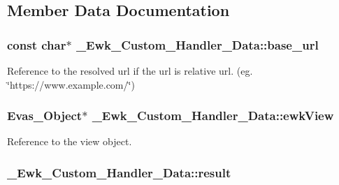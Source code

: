 \subsection{Member Data Documentation}
\hypertarget{struct__Ewk__Custom__Handler__Data_afe9e9ea292e4ee1b849591fa013a4ad0}{
\subsubsection[{base\+\_\+url}]{\setlength{\rightskip}{0pt plus 5cm}const char$\ast$ \+\_\+\+Ewk\+\_\+\+Custom\+\_\+\+Handler\+\_\+\+Data\+::base\+\_\+url}}\label{struct__Ewk__Custom__Handler__Data_afe9e9ea292e4ee1b849591fa013a4ad0}
Reference to the resolved url if the url is relative url. (eg. \char`\"{}https\+://www.\+example.\+com/\char`\"{}) \hypertarget{struct__Ewk__Custom__Handler__Data_aac0742cbb7f855d5f15880f8af398d4f}{
\subsubsection[{ewk\+View}]{\setlength{\rightskip}{0pt plus 5cm}Evas\+\_\+\+Object$\ast$ \+\_\+\+Ewk\+\_\+\+Custom\+\_\+\+Handler\+\_\+\+Data\+::ewk\+View}}\label{struct__Ewk__Custom__Handler__Data_aac0742cbb7f855d5f15880f8af398d4f}
Reference to the view object. \hypertarget{struct__Ewk__Custom__Handler__Data_aa781072df1c097837745795f0c2e74a7}{
\subsubsection[{result}]{ \+\_\+\+Ewk\+\_\+\+Custom\+\_\+\+Handler\+\_\+\+Data\+::result}}\label{struct__Ewk__Custom__Handler__Data_aa781072df1c097837745795f0c2e74a7}

